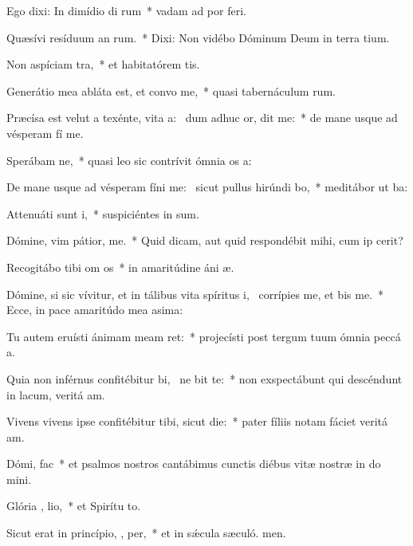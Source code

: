 \item Ego dixi: In dimídio di rum~* vadam ad por feri.
\item Quæsívi resíduum an rum.~* Dixi: Non vidébo Dóminum Deum in terra tium.
\item Non aspíciam  tra,~* et habitatórem tis.
\item Generátio mea abláta est, et convo   me,~* quasi tabernáculum rum.
\item Præcísa est velut a texénte, vita a:~\pscross{} dum adhuc or, dit me:~* de mane usque ad vésperam fí me.
\item Sperábam   ne,~* quasi leo sic contrívit ómnia os a:
\item De mane usque ad vésperam fíni me:~\pscross{} sicut pullus hirúndi  bo,~* meditábor ut ba:
\item Attenuáti sunt  i,~* suspiciéntes in sum.
\item Dómine, vim pátior,   me.~* Quid dicam, aut quid respondébit mihi, cum ip cerit?
\item Recogitábo tibi om  os~* in amaritúdine áni æ.
\item Dómine, si sic vívitur, et in tálibus vita spíritus i,~\pscross{} corrípies me, et bis me.~* Ecce, in pace amaritúdo mea asima:
\item Tu autem eruísti ánimam meam   ret:~* projecísti post tergum tuum ómnia peccá a.
\item Quia non inférnus confitébitur bi,~\pscross{} ne  bit te:~* non exspectábunt qui descéndunt in lacum, veritá am.
\item Vivens vivens ipse confitébitur tibi, sicut   die:~* pater fíliis notam fáciet veritá am.
\item Dómi,   fac~* et psalmos nostros cantábimus cunctis diébus vitæ nostræ in do mini.
\item Glória ,  lio,~* et Spirítu to.
\item Sicut erat in princípio,  ,  per,~* et in sǽcula sæculó. men.
